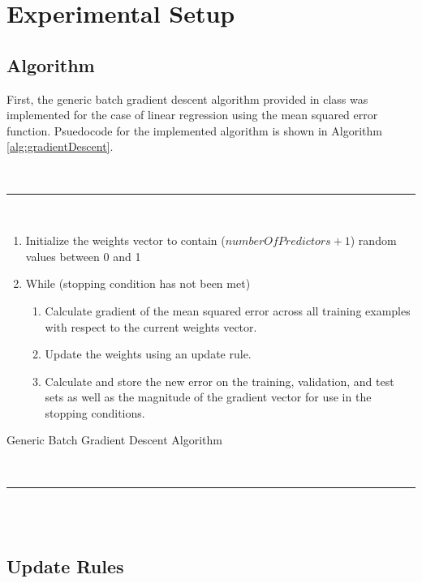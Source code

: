 \documentclass[runningheads]{llncs_2}
\begin{document}
\section{Experimental Setup}
\label{sec:setup}

\subsection{Algorithm}

First, the generic batch gradient descent algorithm provided in class was implemented for the case of linear regression using the mean squared error function. Psuedocode for the implemented algorithm is shown in Algorithm \ref{alg:gradientDescent}.

\begin{algorithm}[H]
	\hspace{1 mm} \\\hrule\hspace{1 mm} \\
	\begin{enumerate}
		\item Initialize the weights vector to contain (\(numberOfPredictors + 1\)) random values between 0 and 1
		\item While (stopping condition has not been met)
		\begin{enumerate}
			\item Calculate gradient of the mean squared error across all training examples with respect to the current weights vector.
			\item Update the weights using an update rule.
			\item Calculate and store the new error on the training, validation, and test sets as well as the magnitude of the gradient vector for use in the stopping conditions.
		\end{enumerate}
	\end{enumerate}
	\caption{Generic Batch Gradient Descent Algorithm}
	\hspace{1 mm} \\\hrule\hspace{1 mm} \\\hspace{1 mm} \\
	\label{alg:gradientDescent}
\end{algorithm}%

\subsection{Update Rules}
\end{document}
